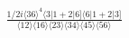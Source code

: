 \documentclass[varwidth, border=5pt]{standalone}
\begin{document}
\begin{my}
$\begin{gathered}
\scriptscriptstyle\frac{1/2i\langle36\rangle^4\langle3|1+2|6]\langle6|1+2|3]}{\langle12\rangle\langle16\rangle\langle23\rangle\langle34\rangle\langle45\rangle\langle56\rangle}
\end{gathered}$
\end{my}
\end{document}
